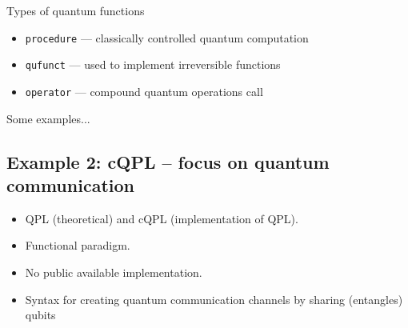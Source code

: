 \documentclass{beamer}
\begin{document}
\begin{frame}{\insertsection}{\insertsubsection}
    Types of quantum functions
    \begin{itemize}
        \item<1-> \texttt{procedure} ---  classically controlled quantum 
        computation 
        \item<2-> \texttt{qufunct} --- used to implement irreversible functions
        \item<3-> \texttt{operator} --- compound quantum operations 
        call
    \end{itemize}
\end{frame}

\begin{frame}{\insertsection}{\insertsubsection}
Some examples...
\end{frame}

\subsection{Example 2: cQPL -- focus on quantum communication}

\begin{frame}{\insertsection}{\insertsubsection}
    
    \begin{itemize}
        \item<1-> QPL (theoretical) and cQPL (implementation of QPL).
        \item<2-> Functional paradigm.
        \item<3-> No public available implementation.
    \end{itemize}
\end{frame}

\begin{frame}{\insertsection}{\insertsubsection}
    
    \begin{itemize}
        \item<1-> Syntax for creating quantum communication channels by sharing 
        (entangles) qubits
    \end{itemize}
\end{frame}
\end{document}
